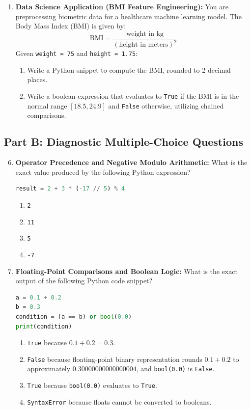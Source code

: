 \begin{enumerate}
\item \textbf{Data Science Application (BMI Feature Engineering):} You are preprocessing biometric data for a healthcare machine learning model. The Body Mass Index (BMI) is given by:
\begin{equation*}
\text{BMI} = \frac{\text{weight in kg}}{(\text{height in meters})^2}
\end{equation*}
Given \texttt{weight = 75} and \texttt{height = 1.75}:
\begin{enumerate}
    \item Write a Python snippet to compute the BMI, rounded to 2 decimal places.
    \item Write a boolean expression that evaluates to \texttt{True} if the BMI is in the normal range $[18.5, 24.9]$ and \texttt{False} otherwise, utilizing chained comparisons.
\end{enumerate}
\end{enumerate}

\subsection*{Part B: Diagnostic Multiple-Choice Questions}
\begin{enumerate}
\setcounter{enumi}{5}
\item \textbf{Operator Precedence and Negative Modulo Arithmetic:} What is the exact value produced by the following Python expression?
\begin{lstlisting}[language=Python]
result = 2 + 3 * (-17 // 5) % 4
\end{lstlisting}
\begin{enumerate}
    \item \texttt{2}
    \item \texttt{11}
    \item \texttt{5}
    \item \texttt{-7}
\end{enumerate}

\item \textbf{Floating-Point Comparisons and Boolean Logic:} What is the exact output of the following Python code snippet?
\begin{lstlisting}[language=Python]
a = 0.1 + 0.2
b = 0.3
condition = (a == b) or bool(0.0)
print(condition)
\end{lstlisting}
\begin{enumerate}
    \item \texttt{True} because $0.1 + 0.2 = 0.3$.
    \item \texttt{False} because floating-point binary representation rounds $0.1 + 0.2$ to approximately $0.30000000000000004$, and \texttt{bool(0.0)} is \texttt{False}.
    \item \texttt{True} because \texttt{bool(0.0)} evaluates to \texttt{True}.
    \item \texttt{SyntaxError} because floats cannot be converted to booleans.
\end{enumerate}
\end{enumerate}
